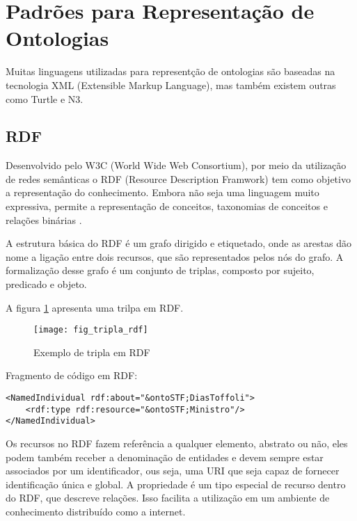 \section{Padrões para Representação de Ontologias}
\label{sec:padroes_para_representacao_de_ontologias}

Muitas linguagens utilizadas para representção de ontologias são baseadas na
tecnologia XML (Extensible Markup Language), mas também existem outras como
Turtle e N3.

\subsection{RDF}
\label{sec:rdf}

Desenvolvido pelo W3C (World Wide Web Consortium), por meio da utilização de
redes semânticas o RDF (Resource Description Framwork) tem como objetivo a
representação do conhecimento. Embora não seja uma linguagem muito expressiva,
permite a representação de conceitos, taxonomias de conceitos e relações binárias \cite{lassila1999resource}.

A estrutura básica do RDF é um grafo dirigido e etiquetado, onde as arestas
dão nome a ligação entre dois recursos, que são representados pelos nós do grafo.
A formalização desse grafo é um conjunto de triplas, composto por sujeito,
predicado e objeto.

A figura \ref{fig:fig_tripla_rdf} apresenta uma trilpa em RDF.

\begin{figure}[!h]
  \centering
  \texttt{[image: fig\_tripla\_rdf]}
  \caption{Exemplo de tripla em RDF}
  \label{fig:fig_tripla_rdf}
\end{figure}

\vskip 0.6cm

Fragmento de código em RDF:

\vskip 0.25cm

\lstset{language=XML,basicstyle=\ttfamily,breaklines=true}
\begin{lstlisting}
<NamedIndividual rdf:about="&ontoSTF;DiasToffoli">
    <rdf:type rdf:resource="&ontoSTF;Ministro"/>
</NamedIndividual>
\end{lstlisting}

\vskip 0.25cm

Os recursos no RDF fazem referência a qualquer elemento, abstrato ou não, eles
podem também receber a denominação de entidades e devem sempre estar associados
por um identificador, ous seja, uma URI que seja capaz de fornecer identificação
única e global. A propriedade é um tipo especial de recurso dentro do RDF, que
descreve relações. Isso facilita a utilização em um ambiente de conhecimento
distribuído como a internet.

